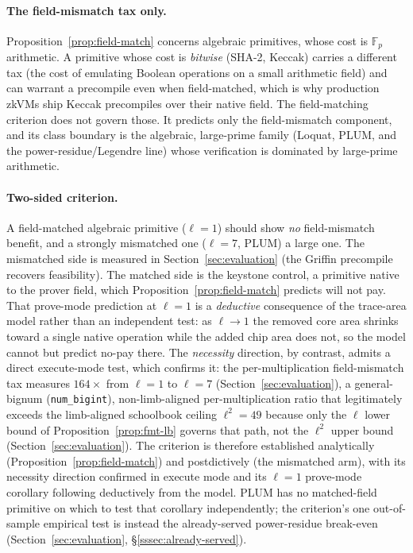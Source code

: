 \paragraph{The field-mismatch tax only.} Proposition~\ref{prop:field-match} concerns algebraic primitives, whose cost is $\mathbb{F}_p$ arithmetic. A primitive whose cost is \emph{bitwise} (SHA-2, Keccak) carries a different tax (the cost of emulating Boolean operations on a small arithmetic field) and can warrant a precompile even when field-matched, which is why production zkVMs ship Keccak precompiles over their native field. The field-matching criterion does not govern those. It predicts only the field-mismatch component, and its class boundary is the algebraic, large-prime family (Loquat, PLUM, and the power-residue/Legendre line) whose verification is dominated by large-prime arithmetic.

\paragraph{Two-sided criterion.} A field-matched algebraic primitive ($\ell=1$) should show \emph{no} field-mismatch benefit, and a strongly mismatched one ($\ell=7$, PLUM) a large one. The mismatched side is measured in Section~\ref{sec:evaluation} (the Griffin precompile recovers feasibility). The matched side is the keystone control, a primitive native to the prover field, which Proposition~\ref{prop:field-match} predicts will not pay. That prove-mode prediction at $\ell=1$ is a \emph{deductive} consequence of the trace-area model rather than an independent test: as $\ell\to1$ the removed core area shrinks toward a single native operation while the added chip area does not, so the model cannot but predict no-pay there. The \emph{necessity} direction, by contrast, admits a direct execute-mode test, which confirms it: the per-multiplication field-mismatch tax measures $164\times$ from $\ell=1$ to $\ell=7$ (Section~\ref{sec:evaluation}), a general-bignum (\texttt{num\_bigint}), non-limb-aligned per-multiplication ratio that legitimately exceeds the limb-aligned schoolbook ceiling $\ell^2=49$ because only the $\ell$ lower bound of Proposition~\ref{prop:fmt-lb} governs that path, not the $\ell^2$ upper bound (Section~\ref{sec:evaluation}). The criterion is therefore established analytically (Proposition~\ref{prop:field-match}) and postdictively (the mismatched arm), with its necessity direction confirmed in execute mode and its $\ell=1$ prove-mode corollary following deductively from the model. PLUM has no matched-field primitive on which to test that corollary independently; the criterion's one out-of-sample empirical test is instead the already-served power-residue break-even (Section~\ref{sec:evaluation}, \S\ref{sssec:already-served}).

